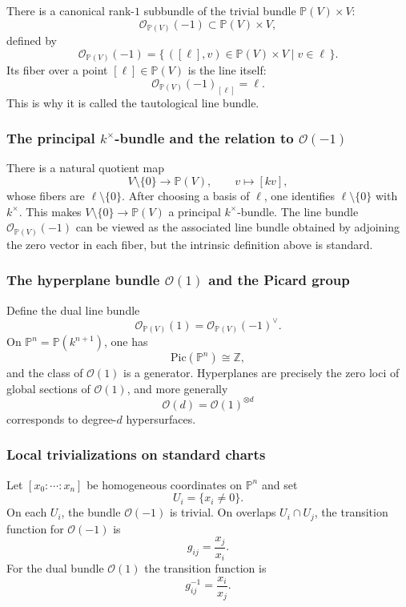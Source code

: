 \documentclass[12pt,a4paper]{article}
\theoremstyle{plain}
\theoremstyle{definition}      %
\begin{document}
There is a canonical rank-$1$ subbundle of the trivial bundle $\mathbb P(V)\times V$:
\[
\mathcal O_{\mathbb P(V)}(-1)\subset \mathbb P(V)\times V,
\]
defined by
\[
\mathcal O_{\mathbb P(V)}(-1)
=
\{\,([\ell],v)\in \mathbb P(V)\times V \mid v\in \ell\,\}.
\]
Its fiber over a point $[\ell]\in \mathbb P(V)$ is the line itself:
\[
\mathcal O_{\mathbb P(V)}(-1)_{[\ell]}=\ell.
\]
This is why it is called the tautological line bundle.

\subsubsection*{The principal $k^\times$-bundle and the relation to $\mathcal O(-1)$}

There is a natural quotient map
\[
V\setminus\{0\}\longrightarrow \mathbb P(V),
\qquad
v\longmapsto [kv],
\]
whose fibers are $\ell\setminus\{0\}$.
After choosing a basis of $\ell$, one identifies $\ell\setminus\{0\}$ with $k^\times$.
This makes $V\setminus\{0\}\to \mathbb P(V)$ a principal $k^\times$-bundle.
The line bundle $\mathcal O_{\mathbb P(V)}(-1)$ can be viewed as the associated line bundle obtained by adjoining the zero vector in each fiber, but the intrinsic definition above is standard.

\subsubsection*{The hyperplane bundle $\mathcal O(1)$ and the Picard group}

Define the dual line bundle
\[
\mathcal O_{\mathbb P(V)}(1)=\mathcal O_{\mathbb P(V)}(-1)^{\vee}.
\]
On $\mathbb P^n=\mathbb P(k^{n+1})$, one has
\[
\mathrm{Pic}(\mathbb P^n)\cong \mathbb Z,
\]
and the class of $\mathcal O(1)$ is a generator.
Hyperplanes are precisely the zero loci of global sections of $\mathcal O(1)$, and more generally
\[
\mathcal O(d)=\mathcal O(1)^{\otimes d}
\]
corresponds to degree-$d$ hypersurfaces.

\subsubsection*{Local trivializations on standard charts}

Let $[x_0:\cdots:x_n]$ be homogeneous coordinates on $\mathbb P^n$ and set
\[
U_i=\{x_i\neq 0\}.
\]
On each $U_i$, the bundle $\mathcal O(-1)$ is trivial.
On overlaps $U_i\cap U_j$, the transition function for $\mathcal O(-1)$ is
\[
g_{ij}=\frac{x_j}{x_i}.
\]
For the dual bundle $\mathcal O(1)$ the transition function is
\[
g_{ij}^{-1}=\frac{x_i}{x_j}.
\]
\end{document}
